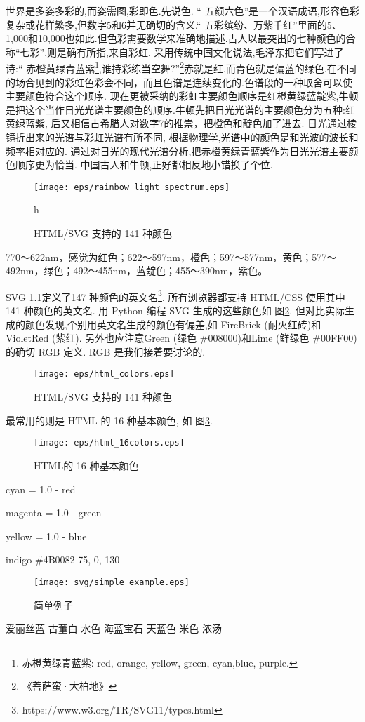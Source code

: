\documentclass[main.tex]{subfiles}
\begin{document}
世界是多姿多彩的,而姿需图,彩即色.先说色.
“ 五颜六色”是一个汉语成语,形容色彩复杂或花样繁多,但数字5和6并无确切的含义.“ 
五彩缤纷、万紫千红”里面的5、1,000和10,000也如此.但色彩需要数学来准确地描述.古人以最突出的七种颜色的合称“七彩”,则是确有所指,来自彩虹.
采用传统中国文化说法,毛泽东把它们写进了诗:“ 赤橙黄绿青蓝紫\footnote{赤橙黄绿青蓝紫: red, orange, yellow, green, cyan,blue, purple.},谁持彩练当空舞?”\footnote{《菩萨蛮·大柏地》}赤就是红,而青色就是偏蓝的绿色.在不同的场合见到的彩虹色彩会不同，而且色谱是连续变化的.色谱段的一种取舍可以使主要颜色符合这个顺序.
现在更被采纳的彩虹主要颜色顺序是红橙黄绿蓝靛紫,牛顿是把这个当作日光光谱主要颜色的顺序.牛顿先把日光光谱的主要颜色分为五种:红黄绿蓝紫,
后又相信古希腊人对数字7的推崇，把橙色和靛色加了进去.
日光通过棱镜折出来的光谱与彩虹光谱有所不同,
根据物理学,光谱中的颜色是和光波的波长和频率相对应的.
通过对日光的现代光谱分析,把赤橙黄绿青蓝紫作为日光光谱主要颜色顺序更为恰当.
中国古人和牛顿,正好都相反地小错换了个位.

\begin{figure}
	\centering
	\texttt{[image: eps/rainbow\_light\_spectrum.eps]}
	\caption{HTML/SVG 支持的 141 种颜色}
	\label{fig:1.4.8}h
\end{figure}

770～622nm，感觉为红色；622～597nm，橙色；597～577nm，黄色；577～492nm，绿色；492～455nm，蓝靛色；455～390nm，紫色。

SVG 1.1定义了147 种颜色的英文名\footnote{https://www.w3.org/TR/SVG11/types.html}.
所有浏览器都支持 HTML/CSS 使用其中 141 种颜色的英文名.
用 Python 编程 SVG 生成的这些颜色如 图\ref{fig:1.4.2}.
但对比实际生成的颜色发现,个别用英文名生成的颜色有偏差,如 FireBrick (耐火红砖)和
VioletRed (紫红). 另外也应注意Green (绿色 \#{}008000)和Lime (鲜绿色 \#{}00FF00)的确切 RGB 定义. RGB 是我们接着要讨论的.

\begin{figure}
	\centering
	\texttt{[image: eps/html\_colors.eps]}
	\caption{HTML/SVG 支持的 141 种颜色}
	\label{fig:1.4.2}
\end{figure}

最常用的则是 HTML 的 16 种基本颜色, 如 图\ref{fig:1.4.3}.

\begin{figure}
	\centering
	\texttt{[image: eps/html\_16colors.eps]}
	\caption{HTML的 16 种基本颜色}
	\label{fig:1.4.3}
\end{figure}

cyan = 1.0 - red

magenta = 1.0 - green

yellow = 1.0 - blue

indigo \#4B0082 75, 0, 130

\begin{figure}
	\centering
	\texttt{[image: svg/simple\_example.eps]}
	\caption{简单例子}
	\label{fig:I.1.}
\end{figure}



爱丽丝蓝%
古董白%
水色%
海蓝宝石%
天蓝色%
米色%
浓汤%

\newpage
\end{document}
